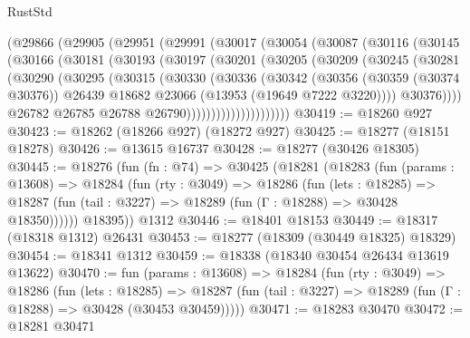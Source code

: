 \begin{lexlean}{RustStd}
\begin{coremodule}
        (@29866
          (@29905
            (@29951
              (@29991
                (@30017
                  (@30054
                    (@30087
                      (@30116
                        (@30145
                          (@30166
                            (@30181
                              (@30193
                                (@30197
                                  (@30201
                                    (@30205
                                      (@30209
                                        (@30245
                                          (@30281
                                            (@30290
                                              (@30295
                                                (@30315
                                                  (@30330
                                                    (@30336
                                                      (@30342
                                                        (@30356
                                                          (@30359 (@30374 @30376))
                                                          @26439
                                                          @18682
                                                          @23066
                                                          (@13953 (@19649 @7222 @3220))))
                                                      @30376))))
                                              @26782
                                              @26785
                                              @26788
                                              @26790)))))))))))))))))))))
@30419 := @18260 @927
@30423 := @18262 (@18266 @927) (@18272 @927)
@30425 := @18277 (@18151 @18278)
@30426 := @13615 @16737
@30428 := @18277 (@30426 @18305)
@30445 := @18276
    (fun (fn : @74) =>
    @30425
      (@18281
        (@18283
          (fun (params : @13608) =>
          @18284
            (fun (rty : @3049) =>
            @18286
              (fun (lets : @18285) =>
              @18287 (fun (tail : @3227) => @18289 (fun (Γ : @18288) => @30428 @18350))))))
        @18395))
    @1312
@30446 := @18401 @18153
@30449 := @18317 (@18318 @1312) @26431
@30453 := @18277 (@18309 (@30449 @18325) @18329)
@30454 := @18341 @1312
@30459 := @18338 (@18340 @30454 @26434 @13619 @13622)
@30470 := fun (params : @13608) =>
  @18284
    (fun (rty : @3049) =>
    @18286
      (fun (lets : @18285) =>
      @18287 (fun (tail : @3227) => @18289 (fun (Γ : @18288) => @30428 (@30453 @30459)))))
@30471 := @18283 @30470
@30472 := @18281 @30471

\end{coremodule}
\end{lexlean}
